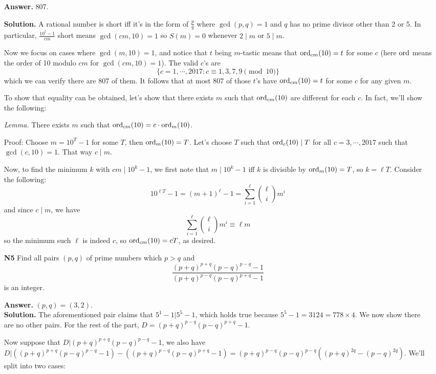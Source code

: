 \documentclass[11pt,a4paper]{article}
\begin{document}
\begin{enumerate}
    \textbf{Answer.} 807. 
    
    \textbf{Solution.} 
    A rational number is short iff it's in the form of $\frac pq$ where $\gcd(p, q)=1$ and $q$ has no prime divisor other than 2 or 5. 
    In particular, $\frac{10^t-1}{cm}$ short means $\gcd(cm, 10)=1$
    so $S(m)=0$ whenever $2\mid m$ or $5\mid m$. 
    
    Now we focus on cases where $\gcd(m, 10)=1$, 
    and notice that $t$ being $m$-tastic means that $\text{ord}_{cm}(10)=t$ for some $c$ (here $\text{ord}$ means the order of 10 modulo $cm$ for $\gcd(cm, 10)=1$). 
    The valid $c$'s are 
    \[
    \{c=1, \cdots, 2017: c\equiv 1, 3, 7, 9\pmod{10}\}
    \]
    which we can verify there are 807 of them. 
    It follows that at most 807 of those $t$'s have $\text{ord}_{cm}(10)=t$ for some $c$ for any given $m$. 
    
    To show that equality can be obtained, 
    let's show that there exists $m$ such that $\text{ord}_{cm}(10)$ are different for each $c$. 
    In fact, we'll show the following: 
    
    \emph{Lemma.} 
    There exists $m$ such that $\text{ord}_{cm}(10)=c\cdot\text{ord}_m(10)$. 
    
    Proof: Choose $m=10^T-1$ for some $T$, then $\text{ord}_m(10)=T$. 
    Let's choose $T$ such that $\text{ord}_c(10)\mid T$ for all $c=3, \cdots, 2017$ such that $\gcd(c, 10)=1$. 
    That way $c\mid m$. 
    
    Now, to find the minimum $k$ with $cm\mid 10^k-1$, 
    we first note that $m\mid 10^k-1$ iff $k$ is divisible by $\text{ord}_m(10)=T$, so $k=\ell T$. 
    Consider the following: 
    \[
    10^{\ell T}-1
    =(m+1)^{\ell}-1
    =\sum_{i=1}^{\ell}\binom{\ell}{i}m^{i}
    \]
    and since $c\mid m$, we have 
    \[
    \sum_{i=1}^{\ell}\binom{\ell}{i}m^{i}
    \equiv \ell m
    \]
    so the minimum such $\ell$ is indeed $c$, so $\text{ord}_{cm}(10)=cT$, as desired. 
    
    \item[\textbf{N5}] Find all pairs $(p,q)$ of prime numbers which $p>q$ and
    $$\frac{(p+q)^{p+q}(p-q)^{p-q}-1}{(p+q)^{p-q}(p-q)^{p+q}-1}$$is an integer.
    
    \textbf{Answer.} $(p, q)=(3, 2)$. \\
    \textbf{Solution.} The aforementioned pair claims that $5^1-1|5^5-1$, which holds true because $5^5-1=3124=778\times 4$. We now show there are no other pairs. 
    For the rest of the part, $D=(p+q)^{p-q}(p-q)^{p+q}-1$. 
    
    Now suppose that $D|(p+q)^{p+q}(p-q)^{p-q}-1$, we also have 
    $D|((p+q)^{p+q}(p-q)^{p-q}-1) - ((p+q)^{p-q}(p-q)^{p+q}-1)
    =(p+q)^{p-q}(p-q)^{p-q}((p+q)^{2q}-(p-q)^{2q}). 
    $
    We'll split into two cases: 
    

\end{enumerate}
\end{document}
